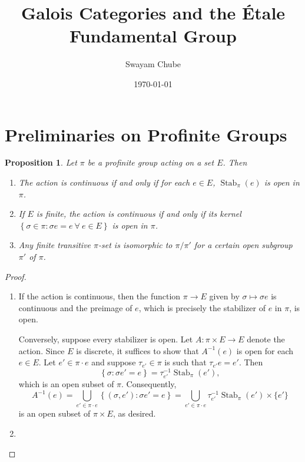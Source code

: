 \documentclass[10pt]{article}
\title{Galois Categories and the \'Etale Fundamental Group}
\author{Swayam Chube}
\date{\today}
\theoremstyle{thmstyle}
\newtheorem{proposition}[theorem]{Proposition}
\theoremstyle{defstyle}
\newcommand{\Stab}{\operatorname{Stab}}
\begin{document}
\maketitle

\section{Preliminaries on Profinite Groups}

\begin{proposition}
    Let $\pi$ be a profinite group acting on a set $E$. Then 
    \begin{enumerate}[label=(\arabic*)]
        \item The action is continuous if and only if for each $e\in E$, $\Stab_{\pi}(e)$ is open in $\pi$.
        \item If $E$ is finite, the action is continuous if and only if its kernel $\left\{\sigma\in\pi\colon \sigma e = e~\forall~e\in E\right\}$ is open in $\pi$.
        \item Any finite transitive $\pi$-set is isomorphic to $\pi/\pi'$ for a certain open subgroup $\pi'$ of $\pi$.
    \end{enumerate}
\end{proposition}
\begin{proof}
\begin{enumerate}[label=(\arabic*)]
    \item If the action is continuous, then the function $\pi\to E$ given by $\sigma\mapsto \sigma e$ is continuous and the preimage of $e$, which is precisely the stabilizer of $e$ in $\pi$, is open. 
    
    Conversely, suppose every stabilizer is open. Let $A: \pi\times E\to E$ denote the action. Since $E$ is discrete, it suffices to show that $A^{-1}(e)$ is open for each $e\in E$. Let $e'\in\pi\cdot e$ and suppose $\tau_{e'}\in\pi$ is such that $\tau_{e'} e = e'$. Then 
    \begin{equation*}
        \left\{\sigma\colon \sigma e' = e\right\} = \tau_{e'}^{-1}\Stab_{\pi}(e'),
    \end{equation*}
    which is an open subset of $\pi$. Consequently, 
    \begin{equation*}
        A^{-1}(e) = \bigcup_{e'\in\pi\cdot e} \left\{(\sigma, e')\colon \sigma e' = e\right\} = \bigcup_{e'\in\pi\cdot e}\tau_{e'}^{-1}\Stab_\pi(e')\times\{e'\}
    \end{equation*}
    is an open subset of $\pi\times E$, as desired.
    \item %
\end{enumerate}
\end{proof}
\end{document}
